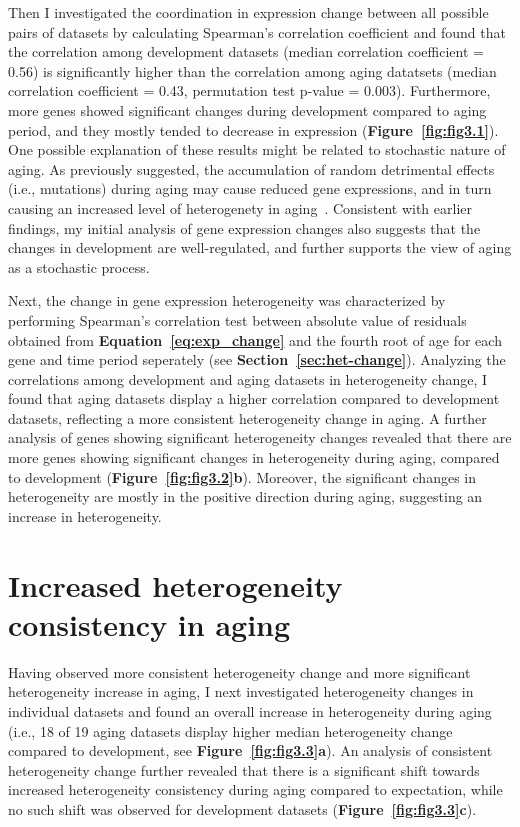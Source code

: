 Then I investigated the coordination in expression change between all possible pairs of datasets by calculating Spearman's correlation coefficient 
and found that the correlation among development datasets (median correlation coefficient = 0.56) 
is significantly higher than the correlation among aging datatsets (median correlation coefficient = 0.43, permutation test p-value = 0.003).
Furthermore, more genes showed significant changes during development compared to aging period, and they mostly tended to decrease in expression (\textbf{Figure~\ref{fig:fig3.1}}).
One possible explanation of these results might be related to stochastic nature of aging. 
As previously suggested, the accumulation of random detrimental effects (i.e., mutations) during aging may cause reduced gene expressions, 
and in turn causing an increased level of heterogenety in aging~\cite{Lu2004}.
Consistent with earlier findings, my initial analysis of gene expression changes also suggests that the changes in development are well-regulated,
and further supports the view of aging as a stochastic process.

Next, the change in gene expression heterogeneity was characterized 
by performing Spearman's correlation test between absolute value of residuals obtained from \textbf{Equation~\ref{eq:exp_change}} 
and the fourth root of age for each gene and time period seperately (see \textbf{Section~\ref{sec:het-change}}).
Analyzing the correlations among development and aging datasets in heterogeneity change,
I found that aging datasets display a higher correlation compared to development datasets, 
reflecting a more consistent heterogeneity change in aging.
A further analysis of genes showing significant heterogeneity changes revealed that 
there are more genes showing significant changes in heterogeneity during aging, compared to development (\textbf{Figure~\ref{fig:fig3.2}b}). 
Moreover, the significant changes in heterogeneity are mostly in the positive direction during aging, suggesting an increase in heterogeneity.

\section{Increased heterogeneity consistency in aging}
Having observed more consistent heterogeneity change and more significant heterogeneity increase in aging, 
I next investigated heterogeneity changes in individual datasets and found an overall increase in heterogeneity during aging 
(i.e., 18 of 19 aging datasets display higher median heterogeneity change compared to development, see \textbf{Figure~\ref{fig:fig3.3}a}). 
An analysis of consistent heterogeneity change further revealed that there is a significant shift towards increased heterogeneity consistency during aging compared to expectation,
while no such shift was observed for development datasets (\textbf{Figure~\ref{fig:fig3.3}c}).

